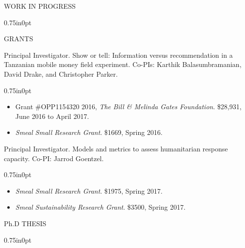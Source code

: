 \documentclass[letterpaper,11pt,oneside]{article}
\newcommand\myIndent{0.75in}
\newcommand\myParSkip{3pt}
\newcommand\myHangIndent{1in}
\newcommand\mySpaceBeforeSection{0.9em}
\newcommand\myNegSpaceCorrectBib{-4.25em}
\newcommand\mySpaceBeforeSectionAfterBib{0em}
\newcommand{\NiceIndent}{ \parindent=\myIndent \hangindent=\myHangIndent }
\newenvironment{miniListBullet}
    {
        \begin{adjustwidth}{\myIndent}{0pt}
        \setlength{\parskip}{0pt}%
        \renewcommand\labelitemi{{\boldmath$\cdot$}}
        \begin{itemize}
        \setlength\itemsep{0em}
    }
    {
        \end{itemize}
        \setlength{\parskip}{\myParSkip}%
        \end{adjustwidth}
    }
\begin{document}
\vspace{\mySpaceBeforeSectionAfterBib}
\noindent WORK IN PROGRESS
\vspace{\myNegSpaceCorrectBib}
\begin{bibunit}
    \begin{adjustwidth}{\myIndent}{0pt}
        
        \nocite{acimovic_show_2016}
        \nocite{hu_dual_2017}
        \nocite{acimovic_heterolead_2017}
        
        \putbib
    \end{adjustwidth}
\end{bibunit}

\vspace{\mySpaceBeforeSectionAfterBib}
\noindent GRANTS

\NiceIndent Principal Investigator.  Show or tell: Information versus recommendation in a Tanzanian mobile money field experiment.   Co-PIs: Karthik Balasumbramanian, David Drake, and Christopher Parker.
\begin{miniListBullet}
    \item Grant \#OPP1154320 2016,  \textit{The Bill \& Melinda Gates Foundation}.  \$28,931, June 2016 to April 2017.
    \item \textit{Smeal Small Research Grant}.  \$1669, Spring 2016.
\end{miniListBullet}



\NiceIndent Principal Investigator.  Models and metrics to assess humanitarian response capacity.   Co-PI: Jarrod Goentzel.
\begin{miniListBullet}
    \item \textit{Smeal Small Research Grant}.  \$1975, Spring 2017.
    \item \textit{Smeal Sustainability Research Grant}.  \$3500, Spring 2017.
\end{miniListBullet}



\vspace{\mySpaceBeforeSection}

\noindent Ph.D THESIS
\vspace{\myNegSpaceCorrectBib}
\begin{bibunit}
    \begin{adjustwidth}{\myIndent}{0pt}
        
        \nocite{acimovic_lowering_2012}
        
        \putbib
    \end{adjustwidth}
\end{bibunit}
\end{document}
